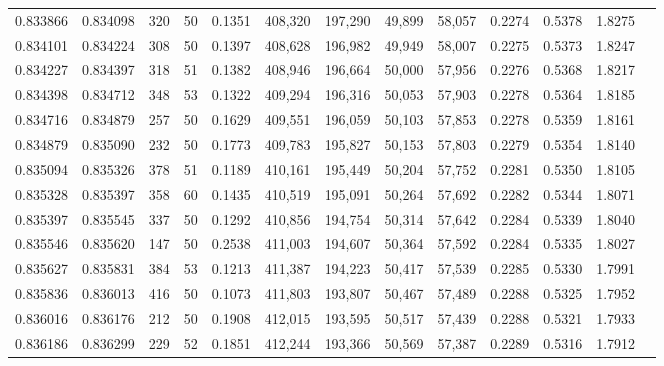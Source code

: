\begin{tabular}{rrrrrrrrrrrrr}
0.833866 & 0.834098 &   320 &  50 &                                     0.1351 & 408,320 & 197,290 &  49,899 &  58,057 & 0.2274 & 0.5378 & 1.8275 \\
0.834101 & 0.834224 &   308 &  50 &                                     0.1397 & 408,628 & 196,982 &  49,949 &  58,007 & 0.2275 & 0.5373 & 1.8247 \\
0.834227 & 0.834397 &   318 &  51 &                                     0.1382 & 408,946 & 196,664 &  50,000 &  57,956 & 0.2276 & 0.5368 & 1.8217 \\
0.834398 & 0.834712 &   348 &  53 &                                     0.1322 & 409,294 & 196,316 &  50,053 &  57,903 & 0.2278 & 0.5364 & 1.8185 \\
0.834716 & 0.834879 &   257 &  50 &                                     0.1629 & 409,551 & 196,059 &  50,103 &  57,853 & 0.2278 & 0.5359 & 1.8161 \\
0.834879 & 0.835090 &   232 &  50 &                                     0.1773 & 409,783 & 195,827 &  50,153 &  57,803 & 0.2279 & 0.5354 & 1.8140 \\
0.835094 & 0.835326 &   378 &  51 &                                     0.1189 & 410,161 & 195,449 &  50,204 &  57,752 & 0.2281 & 0.5350 & 1.8105 \\
0.835328 & 0.835397 &   358 &  60 &                                     0.1435 & 410,519 & 195,091 &  50,264 &  57,692 & 0.2282 & 0.5344 & 1.8071 \\
0.835397 & 0.835545 &   337 &  50 &                                     0.1292 & 410,856 & 194,754 &  50,314 &  57,642 & 0.2284 & 0.5339 & 1.8040 \\
0.835546 & 0.835620 &   147 &  50 &                                     0.2538 & 411,003 & 194,607 &  50,364 &  57,592 & 0.2284 & 0.5335 & 1.8027 \\
0.835627 & 0.835831 &   384 &  53 &                                     0.1213 & 411,387 & 194,223 &  50,417 &  57,539 & 0.2285 & 0.5330 & 1.7991 \\
0.835836 & 0.836013 &   416 &  50 &                                     0.1073 & 411,803 & 193,807 &  50,467 &  57,489 & 0.2288 & 0.5325 & 1.7952 \\
0.836016 & 0.836176 &   212 &  50 &                                     0.1908 & 412,015 & 193,595 &  50,517 &  57,439 & 0.2288 & 0.5321 & 1.7933 \\
0.836186 & 0.836299 &   229 &  52 &                                     0.1851 & 412,244 & 193,366 &  50,569 &  57,387 & 0.2289 & 0.5316 & 1.7912 \\

\end{tabular}
